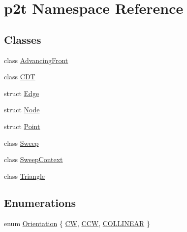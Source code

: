 \hypertarget{namespacep2t}{}\section{p2t Namespace Reference}
\label{namespacep2t}
\subsection*{Classes}
\begin{DoxyCompactItemize}
\item 
class \hyperlink{classp2t_1_1_advancing_front}{Advancing\+Front}
\item 
class \hyperlink{classp2t_1_1_c_d_t}{C\+D\+T}
\item 
struct \hyperlink{structp2t_1_1_edge}{Edge}
\item 
struct \hyperlink{structp2t_1_1_node}{Node}
\item 
struct \hyperlink{structp2t_1_1_point}{Point}
\item 
class \hyperlink{classp2t_1_1_sweep}{Sweep}
\item 
class \hyperlink{classp2t_1_1_sweep_context}{Sweep\+Context}
\item 
class \hyperlink{classp2t_1_1_triangle}{Triangle}
\end{DoxyCompactItemize}
\subsection*{Enumerations}
\begin{DoxyCompactItemize}
\item 
enum \hyperlink{namespacep2t_a3ffe1d5b88773615026d5e590e3662eb}{Orientation} \{ \hyperlink{namespacep2t_a3ffe1d5b88773615026d5e590e3662eba005d0f4a800b4d758e8a40eb756c8d3b}{C\+W}, 
\hyperlink{namespacep2t_a3ffe1d5b88773615026d5e590e3662eba953e6ad6ac330aa719772fafeffa971a}{C\+C\+W}, 
\hyperlink{namespacep2t_a3ffe1d5b88773615026d5e590e3662ebad6bd308f4c1c9cd1a39bd4ae8e7d5387}{C\+O\+L\+L\+I\+N\+E\+A\+R}
 \}
\end{DoxyCompactItemize}

